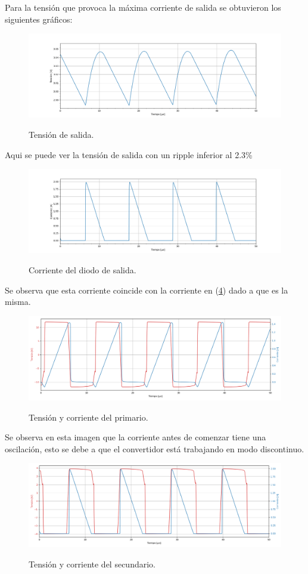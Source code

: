 Para la tensión que provoca la máxima corriente de salida se obtuvieron los siguientes gráficos:
\begin{figure}[H]
	\centering
	\includegraphics[width=\linewidth]{ImagenesParteII/ Vo.png}
	\label{fig:vo}
	\caption{Tensión de salida.}
\end{figure}
Aqui se puede ver la tensión de salida con un ripple inferior al 2.3\%
\begin{figure}[H]
	\centering
	\includegraphics[width=\linewidth]{ImagenesParteII/Idiodo.png}
	\label{fig:idiodo}
	\caption{Corriente del diodo de salida.}
\end{figure}
Se observa que esta corriente coincide con la corriente en (\ref{fig:secundario}) dado a que es la misma.
\begin{figure}[H]
	\centering
	\includegraphics[width=0.9\linewidth]{ImagenesParteII/Primario.png}
	\label{fig:primario}
	\caption{Tensión y corriente del primario.}
\end{figure}
Se observa en esta imagen que la corriente antes de comenzar tiene una oscilación, esto se debe a que el convertidor está trabajando en modo discontinuo.
\begin{figure}[H]
	\centering
	\includegraphics[width=0.9\linewidth]{ImagenesParteII/Secundario.png}
	\label{fig:secundario}
	\caption{Tensión y corriente del secundario.}
\end{figure}

